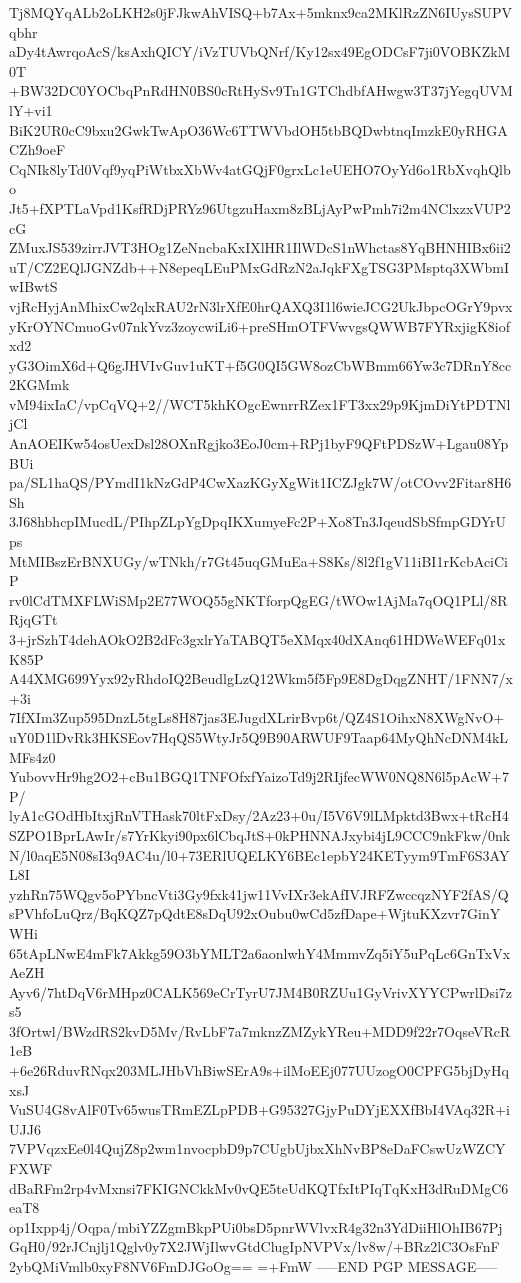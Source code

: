 Tj8MQYqALb2oLKH2s0jFJkwAhVISQ+b7Ax+5mknx9ca2MKlRzZN6IUysSUPVqbhr
aDy4tAwrqoAcS/ksAxhQICY/iVzTUVbQNrf/Ky12sx49EgODCsF7ji0VOBKZkM0T
+BW32DC0YOCbqPnRdHN0BS0cRtHySv9Tn1GTChdbfAHwgw3T37jYegqUVMlY+vi1
BiK2UR0cC9bxu2GwkTwApO36Wc6TTWVbdOH5tbBQDwbtnqImzkE0yRHGACZh9oeF
CqNIk8lyTd0Vqf9yqPiWtbxXbWv4atGQjF0grxLc1eUEHO7OyYd6o1RbXvqhQlbo
Jt5+fXPTLaVpd1KsfRDjPRYz96UtgzuHaxm8zBLjAyPwPmh7i2m4NClxzxVUP2cG
ZMuxJS539zirrJVT3HOg1ZeNncbaKxIXlHR1IlWDcS1nWhctas8YqBHNHIBx6ii2
uT/CZ2EQlJGNZdb++N8epeqLEuPMxGdRzN2aJqkFXgTSG3PMsptq3XWbmIwIBwtS
vjRcHyjAnMhixCw2qlxRAU2rN3lrXfE0hrQAXQ3I1l6wieJCG2UkJbpcOGrY9pvx
yKrOYNCmuoGv07nkYvz3zoycwiLi6+preSHmOTFVwvgsQWWB7FYRxjigK8iofxd2
yG3OimX6d+Q6gJHVIvGuv1uKT+f5G0QI5GW8ozCbWBmm66Yw3c7DRnY8cc2KGMmk
vM94ixIaC/vpCqVQ+2//WCT5khKOgcEwnrrRZex1FT3xx29p9KjmDiYtPDTNljCl
AnAOEIKw54osUexDsl28OXnRgjko3EoJ0cm+RPj1byF9QFtPDSzW+Lgau08YpBUi
pa/SL1haQS/PYmdI1kNzGdP4CwXazKGyXgWit1ICZJgk7W/otCOvv2Fitar8H6Sh
3J68hbhcpIMucdL/PIhpZLpYgDpqIKXumyeFc2P+Xo8Tn3JqeudSbSfmpGDYrUps
MtMIBszErBNXUGy/wTNkh/r7Gt45uqGMuEa+S8Ks/8l2f1gV11iBI1rKcbAciCiP
rv0lCdTMXFLWiSMp2E77WOQ55gNKTforpQgEG/tWOw1AjMa7qOQ1PLl/8RRjqGTt
3+jrSzhT4dehAOkO2B2dFc3gxlrYaTABQT5eXMqx40dXAnq61HDWeWEFq01xK85P
A44XMG699Yyx92yRhdoIQ2BeudlgLzQ12Wkm5f5Fp9E8DgDqgZNHT/1FNN7/x+3i
7IfXIm3Zup595DnzL5tgLs8H87jas3EJugdXLrirBvp6t/QZ4S1OihxN8XWgNvO+
uY0D1lDvRk3HKSEov7HqQS5WtyJr5Q9B90ARWUF9Taap64MyQhNcDNM4kLMFs4z0
YubovvHr9hg2O2+cBu1BGQ1TNFOfxfYaizoTd9j2RIjfecWW0NQ8N6l5pAcW+7P/
lyA1cGOdHbItxjRnVTHask70ltFxDsy/2Az23+0u/I5V6V9lLMpktd3Bwx+tRcH4
SZPO1BprLAwIr/s7YrKkyi90px6lCbqJtS+0kPHNNAJxybi4jL9CCC9nkFkw/0nk
N/l0aqE5N08sI3q9AC4u/l0+73ERlUQELKY6BEc1epbY24KETyym9TmF6S3AYL8I
yzhRn75WQgv5oPYbncVti3Gy9fxk41jw11VvIXr3ekAfIVJRFZwccqzNYF2fAS/Q
sPVhfoLuQrz/BqKQZ7pQdtE8sDqU92xOubu0wCd5zfDape+WjtuKXzvr7GinYWHi
65tApLNwE4mFk7Akkg59O3bYMLT2a6aonlwhY4MmmvZq5iY5uPqLc6GnTxVxAeZH
Ayv6/7htDqV6rMHpz0CALK569eCrTyrU7JM4B0RZUu1GyVrivXYYCPwrlDsi7zs5
3fOrtwl/BWzdRS2kvD5Mv/RvLbF7a7mknzZMZykYReu+MDD9f22r7OqseVRcR1eB
+6e26RduvRNqx203MLJHbVhBiwSErA9s+ilMoEEj077UUzogO0CPFG5bjDyHqxsJ
VuSU4G8vAlF0Tv65wusTRmEZLpPDB+G95327GjyPuDYjEXXfBbI4VAq32R+iUJJ6
7VPVqzxEe0l4QujZ8p2wm1nvocpbD9p7CUgbUjbxXhNvBP8eDaFCswUzWZCYFXWF
dBaRFm2rp4vMxnsi7FKIGNCkkMv0vQE5teUdKQTfxItPIqTqKxH3dRuDMgC6eaT8
op1Ixpp4j/Oqpa/mbiYZZgmBkpPUi0bsD5pnrWVlvxR4g32n3YdDiiHlOhIB67Pj
GqH0/92rJCnjlj1Qglv0y7X2JWjIlwvGtdClugIpNVPVx/lv8w/+BRz2lC3OsFnF
2ybQMiVmlb0xyF8NV6FmDJGoOg==
=+FmW
-----END PGP MESSAGE-----
